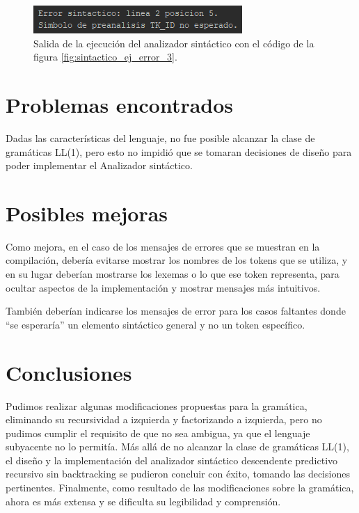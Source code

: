 \begin{figure}[H]
\centering
\includegraphics[scale=1]{img/sintactico/salida_sintactico_ej_error_3.png}
\caption{Salida de la ejecución del analizador sintáctico con el código de la figura \ref{fig:sintactico_ej_error_3}.}
\label{fig:sintactico_ej_error_3_salida}
\end{figure}

\section{Problemas encontrados}
Dadas las características del lenguaje, no fue posible alcanzar la clase de gramáticas LL(1), pero esto no impidió que se tomaran decisiones de diseño para poder implementar el Analizador sintáctico.

\section{Posibles mejoras}
Como mejora, en el caso de los mensajes de errores que se muestran en la compilación, debería evitarse mostrar los nombres de los tokens que se utiliza, y en su lugar deberían mostrarse los lexemas o lo que ese token representa, para ocultar aspectos de la implementación y mostrar mensajes más intuitivos.

También deberían indicarse los mensajes de error para los casos faltantes donde ``se esperaría'' un elemento sintáctico general y no un token específico.

\section{Conclusiones}
Pudimos realizar algunas modificaciones propuestas para la gramática, eliminando su recursividad a izquierda y factorizando a izquierda, pero no pudimos cumplir el requisito de que no sea ambigua, ya que el lenguaje subyacente no lo permitía. Más allá de no alcanzar la clase de gramáticas LL(1), el diseño y la implementación del analizador sintáctico descendente predictivo recursivo sin backtracking se pudieron concluir con éxito, tomando las decisiones pertinentes. Finalmente, como resultado de las modificaciones sobre la gramática, ahora es más extensa y se dificulta su legibilidad y comprensión.